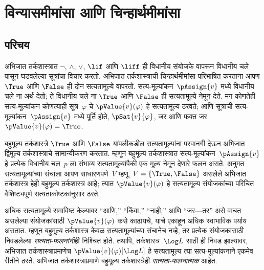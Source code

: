 \chapter{विन्यासमीमांसा आणि चिन्हार्थमीमांसा}\label{mvl:syn:chap}









\section{परिचय}\label{mvl:syn:int:sec}

अभिजात तर्कशास्त्रात $\lnot$, $\land$, $\lor$, $\lif$ आणि
$\liff$ ही विधानीय संयोजके वापरून विधानीय चले पासून
घडवलेल्या सूत्रांचा विचार करतो. अभिजात तर्कशास्त्राची
चिन्हार्थमीमांसा परिभाषित करताना आपण $\True$ आणि $\False$ ही दोन
सत्यतामूल्ये वापरतो. सत्य-मूल्यांकन~$\pAssign{v}$ मध्ये
विधानीय चले ना अर्थ देतो; ते विधानीय चले ना $\True$ आणि
$\False$ ही सत्यतामूल्ये नेमून देते. मग कोणतेही सत्य-मूल्यांकन
कोणत्याही सूत्र~$\varphi$ चे $\pValue{v}(\varphi)$ हे सत्यतामूल्य
ठरवते; आणि सूत्राची सत्य-मूल्यांकन~$\pAssign{v}$ मध्ये
पूर्ति होते, $\pSat{v}{\varphi}$, जर आणि फक्त जर
$\pValue{v}(\varphi) = \True$.

बहुमूल्य तर्कशास्त्रे $\True$ आणि $\False$ यांपलीकडील
सत्यतामूल्यांना परवानगी देऊन अभिजात द्विमूल्य तर्कशास्त्राचे
सामान्यीकरण करतात. म्हणून बहुमूल्य तर्कशास्त्रात
सत्य-मूल्यांकन~$\pAssign{v}$ हे प्रत्येक विधानीय चल~$p$
ला संभाव्य सत्यतामूल्यांपैकी एक मूल्य नेमून देणारे फलन असते.
अनुमत सत्यतामूल्यांच्या संचाला आपण साधारणपणे~$V$ म्हणू.
$V = \{\True, \False\}$ असलेले अभिजात तर्कशास्त्र हेही
बहुमूल्य तर्कशास्त्र आहे; त्यात $\pValue{v}(\varphi)$ हे सत्यतामूल्य
संयोजकांच्या परिचित वैशिष्ट्यपूर्ण सत्यताकोष्टकांनुसार ठरते.

अधिक सत्यतामूल्ये समाविष्ट केल्यावर ``आणि,'' ``किंवा,'' ``नाही,''
आणि ``जर---तर'' असे वाचत असलेल्या संयोजकांसाठी
$\pValue{v}(\varphi)$ कसे काढायचे, याचे एकाहून अधिक स्वाभाविक
पर्याय असतात. म्हणून बहुमूल्य तर्कशास्त्र केवळ सत्यतामूल्यांच्या
संचानेच नव्हे, तर प्रत्येक संयोजकासाठी निवडलेल्या
\emph{सत्यता-फलनांनी}ही निश्चित होते. तथापि, तर्कशास्त्र~$\Log L$
साठी ही निवड झाल्यावर, अभिजात तर्कशास्त्राप्रमाणेच
$\pValue{v}(\varphi)[\Log L]$ हे सत्यतामूल्य त्या सत्य-मूल्यांकनाने
एकमेव रीतीने ठरते. अभिजात तर्कशास्त्राप्रमाणे बहुमूल्य
तर्कशास्त्रेही \emph{सत्यता-फलनात्मक} आहेत.

